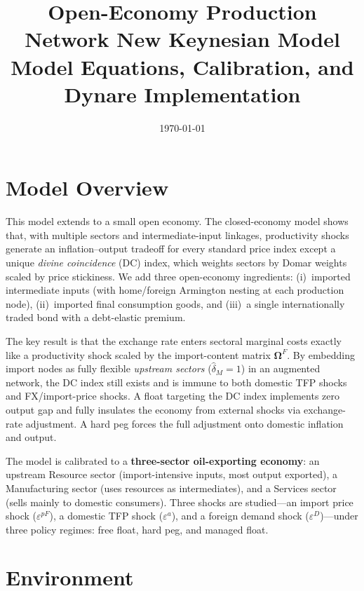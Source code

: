 \documentclass[11pt,a4paper]{article}
\title{\textbf{Open-Economy Production Network New Keynesian Model}\\[4pt]
\large Model Equations, Calibration, and Dynare Implementation}
\author{}
\date{\today}
\newcommand{\OmF}{\bm\Omega^{F}}
\newcommand{\wh}[1]{\widehat{#1}}
\begin{document}
\maketitle
\tableofcontents
\bigskip

\section{Model Overview}

This model extends \citet{Rubbo2024} to a small open economy.  The closed-economy
model shows that, with multiple sectors and intermediate-input linkages, productivity
shocks generate an inflation–output tradeoff for every standard price index except
a unique \emph{divine coincidence} (DC) index, which weights sectors by
Domar weights scaled by price stickiness.  We add three open-economy
ingredients: (i)~imported intermediate inputs (with home/foreign Armington
nesting at each production node), (ii)~imported final consumption goods, and
(iii)~a single internationally traded bond with a debt-elastic premium.

The key result is that the exchange rate enters sectoral marginal costs exactly
like a productivity shock scaled by the import-content matrix $\OmF$.
By embedding import nodes as fully flexible \emph{upstream sectors}
($\wh\delta_{M}=1$) in an augmented network, the DC index still exists
and is immune to both domestic TFP shocks and FX/import-price shocks.
A float targeting the DC index implements zero output gap and fully
insulates the economy from external shocks via exchange-rate adjustment.
A hard peg forces the full adjustment onto domestic inflation and output.

The model is calibrated to a \textbf{three-sector oil-exporting economy}:
an upstream Resource sector (import-intensive inputs, most output exported),
a Manufacturing sector (uses resources as intermediates), and a Services sector
(sells mainly to domestic consumers).  Three shocks are studied---an import
price shock ($\varepsilon^{pF}$), a domestic TFP shock ($\varepsilon^{a}$),
and a foreign demand shock ($\varepsilon^{D}$)---under three policy regimes:
free float, hard peg, and managed float.

\section{Environment}
\end{document}

